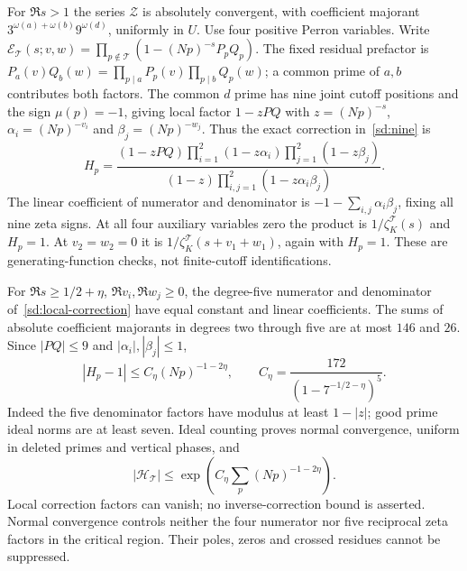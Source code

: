 For $\Re s>1$ the series $\mathcal Z$ is absolutely convergent, with
coefficient majorant
$3^{\omega(a)+\omega(b)}9^{\omega(d)}$, uniformly in $U$.
Use four positive Perron variables. Write $\mathcal E_{\mathcal T}(s;v,w)
=\prod_{p\notin\mathcal T}(1-(Np)^{-s}P_pQ_p)$.
The fixed residual prefactor is
$P_a(v)Q_b(w)=\prod_{p\mid a}P_p(v)\prod_{p\mid b}Q_p(w)$;
a common prime of $a,b$ contributes both factors.
The common $d$ prime has nine joint cutoff positions and the sign
$\mu(p)=-1$, giving local factor $1-zPQ$ with
$z=(Np)^{-s}$, $\alpha_i=(Np)^{-v_i}$ and $\beta_j=(Np)^{-w_j}$.
Thus the exact correction in~\eqref{sd:nine} is
\begin{equation}\label{sd:local-correction}
 H_p=\frac{(1-zPQ)\prod_{i=1}^2(1-z\alpha_i)
                           \prod_{j=1}^2(1-z\beta_j)}
                {(1-z)\prod_{i,j=1}^2(1-z\alpha_i\beta_j)}.
\end{equation}
The linear coefficient of numerator and denominator is
$-1-\sum_{i,j}\alpha_i\beta_j$, fixing all nine zeta signs.
At all four auxiliary variables zero the product is
$1/\zeta_K^{\mathcal T}(s)$ and $H_p=1$.
At $v_2=w_2=0$ it is $1/\zeta_K^{\mathcal T}(s+v_1+w_1)$, again
with $H_p=1$. These are generating-function checks, not finite-cutoff
identifications.

For $\Re s\ge1/2+\eta$, $\Re v_i,\Re w_j\ge0$, the degree-five
numerator and denominator of~\eqref{sd:local-correction} have equal
constant and linear coefficients. The sums of absolute coefficient
majorants in degrees two through five are at most $146$ and $26$.
Since $|PQ|\le9$ and $|\alpha_i|,|\beta_j|\le1$,
\begin{equation}\label{sd:normal}
 |H_p-1|\le C_\eta(Np)^{-1-2\eta},\qquad
 C_\eta=\frac{172}{(1-7^{-1/2-\eta})^5}.
\end{equation}
Indeed the five denominator factors have modulus at least $1-|z|$;
good prime ideal norms are at least seven. Ideal counting proves normal
convergence, uniform in deleted primes and vertical phases, and
\[
 |\mathcal H_{\mathcal T}|
 \le\exp\left(C_\eta\sum_p(Np)^{-1-2\eta}\right).
\]
Local correction factors can vanish; no inverse-correction bound is
asserted. Normal convergence controls neither the four numerator nor
five reciprocal zeta factors in the critical region. Their poles, zeros
and crossed residues cannot be suppressed.

